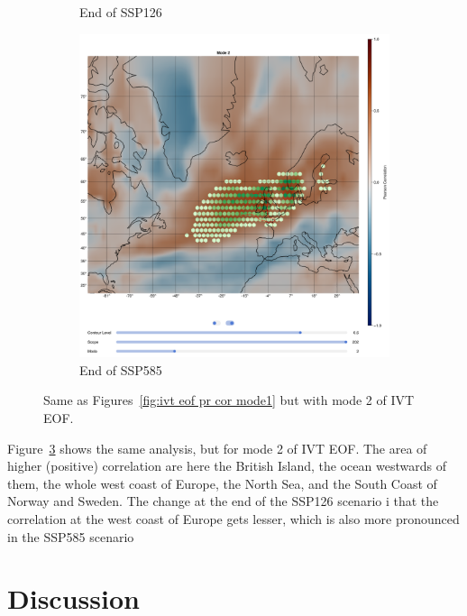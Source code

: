 \begin{figure}[!htb]
\begin{subfigure}[b]{0.32\textwidth}
    \caption{End of SSP126} 
    \label{fig:ivt eof pr cor ssp126 mode2}
  \end{subfigure}
  \begin{subfigure}[b]{0.32\textwidth}
    \includegraphics[width=\textwidth]{figures/ivt_pr_cor_mode2_ssp585_hexbin.png}
    \caption{End of SSP585}
    \label{fig:ivt eof pr cor ssp585 mode2}
  \end{subfigure}
  \caption{Same as Figures~\ref{fig:ivt eof pr cor mode1} but with mode 2 of IVT EOF.}
  \label{fig:ivt eof pr cor mode2}
\end{figure}

Figure~\ref{fig:ivt eof pr cor mode2} shows the same analysis, but for mode 2 of IVT EOF. 
The area of higher (positive) correlation are here the British Island, the ocean westwards of them, the whole west coast of Europe, the North Sea, and the South Coast of Norway and Sweden. 
The change at the end of the SSP126 scenario i that the correlation at the west coast of Europe gets lesser, which is also more pronounced in the SSP585 scenario


\section{Discussion}
\label{sec:discussion}



